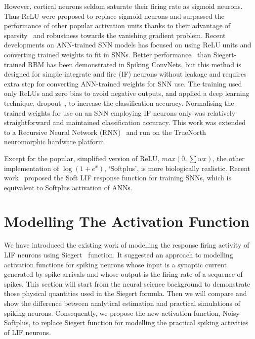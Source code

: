 However, cortical neurons seldom saturate their firing rate as sigmoid neurons.
Thus ReLU were proposed to replace sigmoid neurons and surpassed the performance of other popular activation units thanks to their advantage of sparsity~\cite{glorot2011deep} and robustness towards the vanishing gradient problem. %
Recent developments on ANN-trained SNN models has focused on using ReLU units and converting trained weights to fit in SNNs.
Better performance~\cite{cao2015spiking,diehl2015fast} than Siegert-trained RBM has been demonstrated in Spiking ConvNets, but this method is designed for simple integrate and fire (IF) neurons without leakage and requires extra step for converting ANN-trained weights for SNN use.
The training used only ReLUs and zero bias to avoid negative outputs, and applied a deep learning technique, dropout~\cite{srivastava2014dropout}, to increase the classification accuracy.
Normalising the trained weights for use on an SNN employing IF neurons only was relatively straightforward and maintained classification accuracy.
This work was extended to a Recursive Neural Network (RNN)~\cite{diehl2016conversion} and run on the TrueNorth~\cite{merolla2014million} neuromorphic hardware platform.

Except for the popular, simplified version of ReLU, $max(0,\sum w x)$, the other implementation of $\log(1+e^x)$, `Softplus', is more biologically realistic.
Recent work~\cite{hunsberger2015spiking} proposed the Soft LIF response function for training SNNs, which is equivalent to Softplus activation of ANNs.
	
\section{Modelling The Activation Function}
\label{sec:af_model}
We have introduced the existing work of modelling the response firing activity of LIF neurons using Siegert~\cite{Jug_etal_2012} function.
It suggested an approach to modelling activation functions for spiking neurons whose input is a synaptic current generated by spike arrivals and whose output is the firing rate of a sequence of spikes.
This section will start from the neural science background to demonstrate those physical quantities used in the Siegert formula.
Then we will compare and show the difference between analytical estimation and practical simulations of spiking neurons.
Consequently, we propose the new activation function, Noisy Softplus, to replace Siegert function for modelling the practical spiking activities of LIF neurons.

